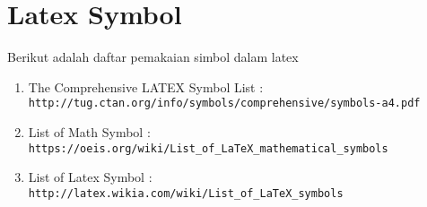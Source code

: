 \chapter{Latex Symbol}
Berikut adalah daftar pemakaian simbol dalam latex
\begin{enumerate}
	\item The Comprehensive LATEX Symbol List : \\
	\verb|http://tug.ctan.org/info/symbols/comprehensive/symbols-a4.pdf|
	\item List of Math Symbol : \\
	\verb|https://oeis.org/wiki/List_of_LaTeX_mathematical_symbols|
	\item List of Latex Symbol : \\
	\verb|http://latex.wikia.com/wiki/List_of_LaTeX_symbols|
\end{enumerate}